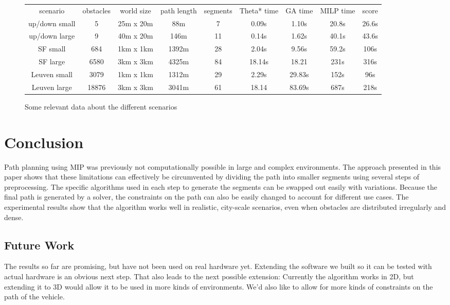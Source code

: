 \begin{figure}
\begin{tabular}{ c c c c c c c c c }
 scenario & obstacles & world size & path length & segments & Theta* time & GA time & MILP time & score \\ 
up/down small & 5 &  25m x 20m & 88m  & 7 & 0.09s & 1.10s & 20.8s & 26.6s\\
up/down large & 9 & 40m x 20m &  146m & 11 & 0.14s & 1.62s & 40.1s & 43.6s \\
SF small & 684 & 1km x 1km & 1392m & 28 & 2.04s & 9.56s & 59.2s & 106s \\
SF large & 6580 & 3km x 3km & 4325m  & 84 & 18.14s & 18.21 & 231s & 316s\\
Leuven small & 3079 & 1km x 1km & 1312m & 29 &  2.29s & 29.83s & 152s  & 96s \\
Leuven large & 18876 & 3km x 3km & 3041m & 61 & 18.14 & 83.69s & 687s & 218s \\

\end{tabular}
\caption{Some relevant data about the different scenarios}
\label{table:results}
\end{figure}

\section{Conclusion}
Path planning using MIP was previously not computationally possible in large and complex environments. The approach presented in this paper shows that these limitations can effectively be circumvented by dividing the path into smaller segments using several steps of preprocessing. The specific algorithms used in each step to generate the segments can be swapped out easily with variations. Because the final path is generated by a solver, the constraints on the path can also be easily changed to account for different use cases. The experimental results show that the algorithm works well in realistic, city-scale scenarios, even when obstacles are distributed irregularly and dense.

\subsection{Future Work}
The results so far are promising, but have not been used on real hardware yet. Extending the software we built so it can be tested with actual hardware is an obvious next step. That also leads to the next possible extension: Currently the algorithm works in 2D, but extending it to 3D would allow it to be used in more kinds of environments. We'd also like to allow for more kinds of constraints on the path of the vehicle.